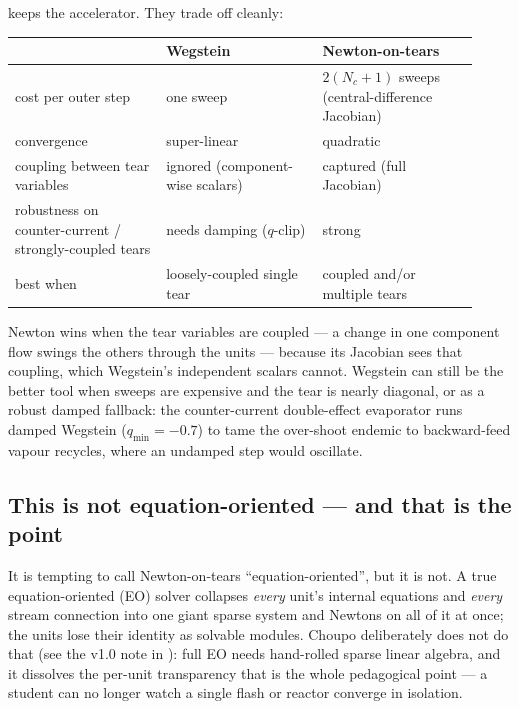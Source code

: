 \documentclass[11pt,a4paper]{article}
\begin{document}
 keeps the accelerator.  They trade
off cleanly:

\begin{center}\small
\begin{tabular}{@{}p{0.30\linewidth}p{0.31\linewidth}p{0.31\linewidth}@{}}
\toprule
 & \textbf{Wegstein} & \textbf{Newton-on-tears} \\
\midrule
cost per outer step & one sweep & $2(N_c + 1)$ sweeps (central-difference Jacobian) \\
convergence & super-linear & quadratic \\
coupling between tear variables & ignored (component-wise scalars) & captured (full Jacobian) \\
robustness on counter-current / strongly-coupled tears & needs damping ($q$-clip) & strong \\
best when & loosely-coupled single tear & coupled and/or multiple tears \\
\bottomrule
\end{tabular}
\end{center}

Newton wins when the tear variables are coupled --- a change in one
component flow swings the others through the units --- because its
Jacobian sees that coupling, which Wegstein's independent scalars
cannot.  Wegstein can still be the better tool when sweeps are
expensive and the tear is nearly diagonal, or as a robust damped
fallback: the counter-current double-effect evaporator
 runs damped Wegstein ($q_{\min} = -0.7$) to tame
the over-shoot endemic to backward-feed vapour recycles, where an
undamped step would oscillate.

\subsection{This is not equation-oriented --- and that is the point}

It is tempting to call Newton-on-tears ``equation-oriented'', but it is
not.  A true equation-oriented (EO) solver collapses \emph{every}
unit's internal equations and \emph{every} stream connection into one
giant sparse system and Newtons on all of it at once; the units lose
their identity as solvable modules.  Choupo deliberately does not do
that (see the v1.0 note in ): full EO needs hand-rolled
sparse linear algebra, and it dissolves the per-unit transparency that
is the whole pedagogical point --- a student can no longer watch a
single flash or reactor converge in isolation.
\end{document}
